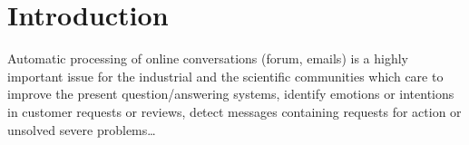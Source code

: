 
\section{Introduction}
\label{sec:intro}

Automatic processing of online conversations (forum, emails) 
is a highly important issue for the industrial and the scientific communities which care to improve the present question/answering systems, identify emotions or intentions in customer requests or reviews, detect messages containing requests for action or unsolved severe problems\ldots
%
%
%
%
%
%

